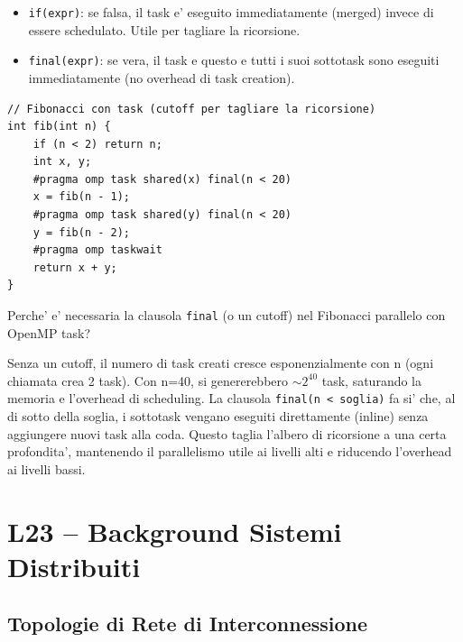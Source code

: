 \documentclass[11pt,a4paper]{article}
\theoremstyle{remark}
\newenvironment{esercizio}[1][]{%
  \begin{tcolorbox}[breakable,title={\textbf{Esercizio / Domanda d'esame}\ifx&#1&\else: #1\fi},
    colback=yellow!5!white, colframe=orange!75!black, fonttitle=\small\bfseries]%
}{%
  \end{tcolorbox}%
}
\newenvironment{risposta}{%
  \begin{tcolorbox}[breakable,title={\textbf{Risposta}},
    colback=green!5!white, colframe=green!50!black, fonttitle=\small\bfseries]%
}{%
  \end{tcolorbox}%
}
\begin{document}
\begin{itemize}
  \item \lstinline|if(expr)|: se falsa, il task e' eseguito immediatamente (merged) invece di essere schedulato. Utile per tagliare la ricorsione.
  \item \lstinline|final(expr)|: se vera, il task e questo e tutti i suoi sottotask sono eseguiti immediatamente (no overhead di task creation).
\end{itemize}

\begin{lstlisting}[style=cpp]
// Fibonacci con task (cutoff per tagliare la ricorsione)
int fib(int n) {
    if (n < 2) return n;
    int x, y;
    #pragma omp task shared(x) final(n < 20)
    x = fib(n - 1);
    #pragma omp task shared(y) final(n < 20)
    y = fib(n - 2);
    #pragma omp taskwait
    return x + y;
}
\end{lstlisting}

\begin{esercizio}
Perche' e' necessaria la clausola \lstinline|final| (o un cutoff) nel Fibonacci parallelo con OpenMP task?
\end{esercizio}
\begin{risposta}
Senza un cutoff, il numero di task creati cresce esponenzialmente con n (ogni chiamata crea 2 task). Con n=40, si genererebbero $\sim 2^{40}$ task, saturando la memoria e l'overhead di scheduling. La clausola \lstinline|final(n < soglia)| fa si' che, al di sotto della soglia, i sottotask vengano eseguiti direttamente (inline) senza aggiungere nuovi task alla coda. Questo taglia l'albero di ricorsione a una certa profondita', mantenendo il parallelismo utile ai livelli alti e riducendo l'overhead ai livelli bassi.
\end{risposta}

\section{L23 -- Background Sistemi Distribuiti}

\subsection{Topologie di Rete di Interconnessione}
\end{document}
